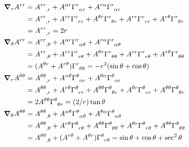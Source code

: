\documentclass[gr-notes.tex]{subfiles}
\begin{document}
\begin{align*}
  \grad_r A^{rr} &=
  \tensor{A}{^{rr}_{,r}} +
  A^{\alpha r} \tensor{\Gamma}{^r_{\alpha r}} +
  A^{r\alpha} \tensor{\Gamma}{^r_{\alpha r}}
  \\ &=
  \tensor{A}{^{rr}_{,r}} +
  A^{r r} \tensor{\Gamma}{^r_{r r}} +
  A^{\theta r} \tensor{\Gamma}{^r_{\theta r}} +
  A^{r r} \tensor{\Gamma}{^r_{r r}} +
  A^{r \theta} \tensor{\Gamma}{^r_{\theta r}}
  \\ &=
  \tensor{A}{^{rr}_{,r}} =
  2 r
  \\
  \grad_\theta A^{r r} &=
  \tensor{A}{^{r r}_{,\theta}} +
  A^{\alpha r} \tensor{\Gamma}{^r_{\alpha \theta}} +
  A^{r \alpha} \tensor{\Gamma}{^r_{\alpha \theta}}
  \\ &=
  \tensor{A}{^{r r}_{,\theta}} +
  A^{r r} \tensor{\Gamma}{^r_{r \theta}} +
  A^{\theta r} \tensor{\Gamma}{^r_{\theta \theta}} +
  A^{r r} \tensor{\Gamma}{^r_{r \theta}} +
  A^{r \theta} \tensor{\Gamma}{^r_{\theta \theta}}
  \\ &=
  (A^{\theta r} + A^{r \theta}) \tensor{\Gamma}{^r_{\theta \theta}} =
  -r^2 (\sin\theta + \cos\theta)
  \\
  \grad_r A^{\theta \theta} &=
  \tensor{A}{^{\theta \theta}_{,r}} +
  A^{\alpha \theta} \tensor{\Gamma}{^\theta_{\alpha r}} +
  A^{\theta \alpha} \tensor{\Gamma}{^\theta_{\alpha r}}
  \\ &=
  \tensor{A}{^{\theta \theta}_{,r}} +
  A^{r \theta} \tensor{\Gamma}{^\theta_{r r}} +
  A^{\theta \theta} \tensor{\Gamma}{^\theta_{\theta r}} +
  A^{\theta r} \tensor{\Gamma}{^\theta_{r r}} +
  A^{\theta \theta} \tensor{\Gamma}{^\theta_{\theta r}}
  \\ &=
  2 A^{\theta \theta} \tensor{\Gamma}{^\theta_{\theta r}} =
  (2/r) \tan\theta
  \\
  \grad_\theta A^{\theta \theta} &=
  \tensor{A}{^{\theta \theta}_{,\theta}} +
  A^{\alpha \theta} \tensor{\Gamma}{^\theta_{\alpha \theta}} +
  A^{\theta \alpha} \tensor{\Gamma}{^\theta_{\alpha \theta}}
  \\ &=
  \tensor{A}{^{\theta \theta}_{,\theta}} +
  A^{r \theta} \tensor{\Gamma}{^\theta_{r \theta}} +
  A^{\theta \theta} \tensor{\Gamma}{^\theta_{\theta \theta}} +
  A^{\theta r} \tensor{\Gamma}{^\theta_{r \theta}} +
  A^{\theta \theta} \tensor{\Gamma}{^\theta_{\theta \theta}}
  \\ &=
  \tensor{A}{^{\theta \theta}_{,\theta}} +
  (A^{r \theta} + A^{\theta r}) \tensor{\Gamma}{^\theta_{r \theta}} =
  \sin\theta + \cos\theta + \sec^2\theta
  \\

\end{align*}
\end{document}
